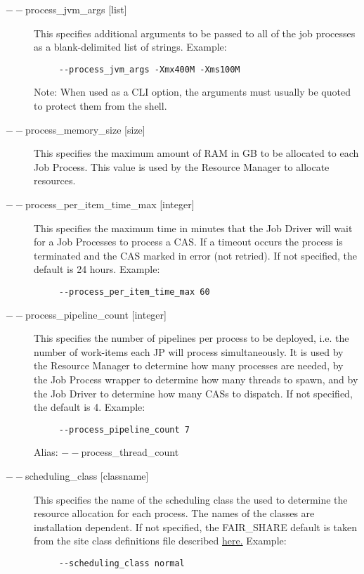 \begin{description}
           \item[$--$process\_jvm\_args {[list]} ] This specifies additional arguments to be passed to
             all of the job processes as a blank-delimited list of strings. Example:
             \begin{verbatim}
     --process_jvm_args -Xmx400M -Xms100M
             \end{verbatim}
             Note: When used as a CLI option, the arguments must usually be
             quoted to protect them from the shell.
                          
           \item[$--$process\_memory\_size {[size]} ] This specifies the maximum amount of RAM in GB
             to be allocated to each Job Process.  This value is used by the Resource Manager to
             allocate resources.

           \item[$--$process\_per\_item\_time\_max {[integer]} ] This specifies the maximum time in
             minutes that the Job Driver will wait for a Job Processes to process a CAS. If a
             timeout occurs the process is terminated and the CAS marked in error (not retried). If
             not specified, the default is 24 hours. Example:
             \begin{verbatim}
     --process_per_item_time_max 60
             \end{verbatim}
             
           \item[$--$process\_pipeline\_count {[integer]} ] This specifies the number of pipelines per
             process to be deployed, i.e. the number of work-items each JP will process simultaneously. 
             It is used by the Resource Manager to determine how many
             processes are needed, by the Job Process wrapper to determine how many threads to
             spawn, and by the Job Driver to determine how many CASs to dispatch. If not specified,
             the default is 4. Example:
             \begin{verbatim}
     --process_pipeline_count 7
             \end{verbatim}
             Alias:  $--$process\_thread\_count
             
           \item[$--$scheduling\_class {[classname]} ] This specifies the name of the scheduling class
             the used to determine the resource allocation for each process. The names of the
             classes are installation dependent. 
             If not specified, the FAIR\_SHARE default is taken from the site class definitions file
             described \hyperref[subsubsec:class.configuration]{here.} 
             Example:
             \begin{verbatim}
     --scheduling_class normal
             \end{verbatim}


\end{description}

